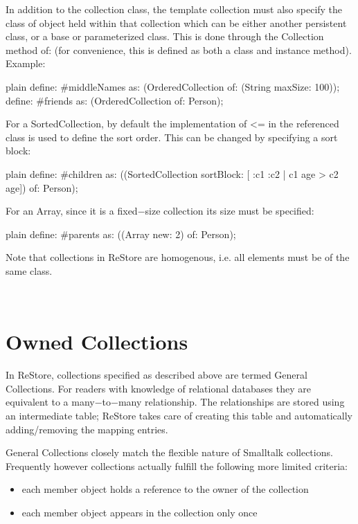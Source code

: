 \documentclass[10pt,twoside,english]{_support/latex/sbabook/sbabook}
\begin{document}
In addition to the collection class, the template collection must also specify the class of object held within that collection which can be either another persistent class, or a base or parameterized class. This is done through the Collection method of: (for convenience, this is defined as both a class and instance method). Example:

\begin{displaycode}{plain}
	define: #middleNames as: (OrderedCollection of: (String maxSize: 100));
	define: #friends as: (OrderedCollection of: Person);
\end{displaycode}

For a SortedCollection, by default the implementation of \textless{}= in the referenced class is used to define the sort order. This can be changed by specifying a sort block: 

\begin{displaycode}{plain}
	define: #children as: ((SortedCollection sortBlock: [ :c1 :c2 | c1 age > c2 age]) of: Person); 
\end{displaycode}

For an Array, since it is a fixed−size collection its size must be specified: 

\begin{displaycode}{plain}
	define: #parents as: ((Array new: 2) of: Person);
\end{displaycode}

Note that collections in ReStore are homogenous, i.e. all elements must be of the same class. 

 
\section{Owned Collections}
In ReStore, collections specified as described above are termed General Collections. For readers with knowledge of relational databases they are equivalent to a many−to−many relationship. The relationships are stored using an intermediate table; ReStore takes care of creating this table and automatically adding/removing the mapping entries.

General Collections closely match the flexible nature of Smalltalk collections. Frequently however collections actually fulfill the following more limited criteria: 

\begin{itemize}
\item each member object holds a reference to the owner of the collection
\item each member object appears in the collection only once 
\end{itemize}
\end{document}
